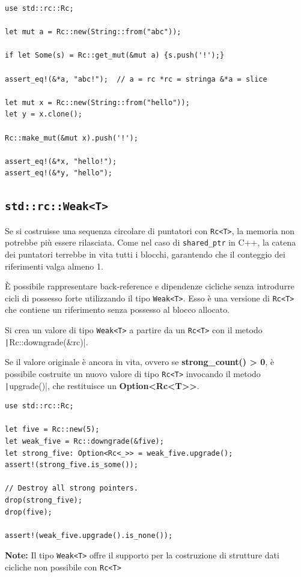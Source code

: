 \begin{verbatim}
use std::rc::Rc;

let mut a = Rc::new(String::from("abc"));

if let Some(s) = Rc::get_mut(&mut a) {s.push('!');}

assert_eq!(&*a, "abc!");  // a = rc *rc = stringa &*a = slice

let mut x = Rc::new(String::from("hello"));
let y = x.clone();

Rc::make_mut(&mut x).push('!');

assert_eq!(&*x, "hello!");
assert_eq!(&*y, "hello");
\end{verbatim}


\subsection{\texttt{std::rc::Weak<T>}}
Se si costruisse una sequenza circolare di puntatori con \verb|Rc<T>|, la memoria non
potrebbe più essere rilasciata.
Come nel caso di \verb|shared_ptr| in C++, la catena dei puntatori terrebbe in vita
tutti i blocchi, garantendo che il conteggio dei riferimenti valga almeno 1.


È possibile rappresentare back-reference e dipendenze cicliche senza introdurre
cicli di possesso forte utilizzando il tipo \verb|Weak<T>|.
Esso è una versione di \verb|Rc<T>| che contiene un riferimento senza possesso
al blocco allocato.

Si crea un valore di tipo \verb|Weak<T>| a partire da un \verb|Rc<T>| con il
metodo \texttt|Rc::downgrade(&rc)|.

Se il valore originale è ancora in vita, ovvero se \textbf{strong\_count() > 0},
è possibile costruite un nuovo valore di tipo \verb|Rc<T>| invocando il
metodo \texttt|upgrade()|, che restituisce un \textbf{Option<Rc<T>>}.


\begin{verbatim}
use std::rc::Rc;

let five = Rc::new(5);
let weak_five = Rc::downgrade(&five);
let strong_five: Option<Rc<_>> = weak_five.upgrade();
assert!(strong_five.is_some());

// Destroy all strong pointers.
drop(strong_five);
drop(five);

assert!(weak_five.upgrade().is_none());
\end{verbatim}

\begin{tcolorbox}
  \textbf{Note:} Il tipo \verb|Weak<T>| offre il supporto per la costruzione di strutture dati cicliche non possibile con \verb|Rc<T>|
\end{tcolorbox}



